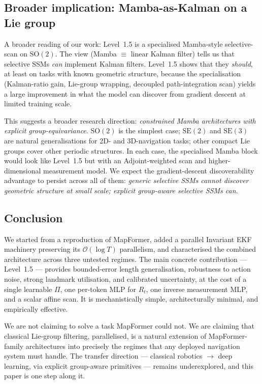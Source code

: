 \subsection{Broader implication: Mamba-as-Kalman on a Lie group}

A broader reading of our work: Level~1.5 is a specialised Mamba-style
selective-scan on $\mathrm{SO}(2)$. The \citet{wang2025mamba-kalman}
view (Mamba $\equiv$ linear Kalman filter) tells us that selective SSMs
\emph{can} implement Kalman filters. Level~1.5 shows that they
\emph{should}, at least on tasks with known geometric structure,
because the specialisation (Kalman-ratio gain, Lie-group wrapping,
decoupled path-integration scan) yields a large improvement in what the
model can discover from gradient descent at limited training scale.

This suggests a broader research direction: \emph{constrained Mamba
architectures with explicit group-equivariance}. $\mathrm{SO}(2)$ is
the simplest case; $\mathrm{SE}(2)$ and $\mathrm{SE}(3)$ are natural
generalisations for 2D- and 3D-navigation tasks; other compact Lie
groups cover other periodic structures. In each case, the specialised
Mamba block would look like Level~1.5 but with an Adjoint-weighted scan
and higher-dimensional measurement model. We expect the gradient-descent
discoverability advantage to persist across all of them: \emph{generic
selective SSMs cannot discover geometric structure at small scale;
explicit group-aware selective SSMs can.}

\subsection{Conclusion}

We started from a reproduction of MapFormer, added a parallel Invariant
EKF machinery preserving its $\mathcal{O}(\log T)$ parallelism, and
characterised the combined architecture across three untested regimes.
The main concrete contribution --- Level~1.5 --- provides bounded-error
length generalisation, robustness to action noise, strong landmark
utilisation, and calibrated uncertainty, at the cost of a single
learnable $\Pi$, one per-token MLP for $R_t$, one inverse measurement
MLP, and a scalar affine scan. It is mechanistically simple,
architecturally minimal, and empirically effective.

We are not claiming to solve a task MapFormer could not. We are
claiming that classical Lie-group filtering, parallelised, is a natural
extension of MapFormer-family architectures into precisely the regimes
that any deployed navigation system must handle. The transfer direction
--- classical robotics $\to$ deep learning, via explicit group-aware
primitives --- remains underexplored, and this paper is one step along
it.
